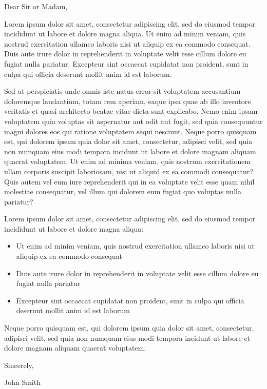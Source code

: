 \documentclass{../classes/coverletter}
\begin{document}
    \begin{body}
        Dear Sir or Madam,
        \newline

        Lorem ipsum dolor sit amet, consectetur adipiscing elit, sed do eiusmod tempor incididunt ut labore et dolore magna aliqua. Ut enim ad minim veniam, quis nostrud exercitation ullamco laboris nisi ut aliquip ex ea commodo consequat. Duis aute irure dolor in reprehenderit in voluptate velit esse cillum dolore eu fugiat nulla pariatur. Excepteur sint occaecat cupidatat non proident, sunt in culpa qui officia deserunt mollit anim id est laborum.
        \newline

        Sed ut perspiciatis unde omnis iste natus error sit voluptatem accusantium doloremque laudantium, totam rem aperiam, eaque ipsa quae ab illo inventore veritatis et quasi architecto beatae vitae dicta sunt explicabo. Nemo enim ipsam voluptatem quia voluptas sit aspernatur aut odit aut fugit, sed quia consequuntur magni dolores eos qui ratione voluptatem sequi nesciunt. Neque porro quisquam est, qui dolorem ipsum quia dolor sit amet, consectetur, adipisci velit, sed quia non numquam eius modi tempora incidunt ut labore et dolore magnam aliquam quaerat voluptatem. Ut enim ad minima veniam, quis nostrum exercitationem ullam corporis suscipit laboriosam, nisi ut aliquid ex ea commodi consequatur? Quis autem vel eum iure reprehenderit qui in ea voluptate velit esse quam nihil molestiae consequatur, vel illum qui dolorem eum fugiat quo voluptas nulla pariatur?
        \newline

        Lorem ipsum dolor sit amet, consectetur adipiscing elit, sed do eiusmod tempor incididunt ut labore et dolore magna aliqua:
        \begin{itemize}
            \item Ut enim ad minim veniam, quis nostrud exercitation ullamco laboris nisi ut aliquip ex ea commodo consequat
            \item Duis aute irure dolor in reprehenderit in voluptate velit esse cillum dolore eu fugiat nulla pariatur
            \item Excepteur sint occaecat cupidatat non proident, sunt in culpa qui officia deserunt mollit anim id est laborum
            \newline
        \end{itemize}

        Neque porro quisquam est, qui dolorem ipsum quia dolor sit amet, consectetur, adipisci velit, sed quia non numquam eius modi tempora incidunt ut labore et dolore magnam aliquam quaerat voluptatem.
        \newline

        Sincerely,
        \newline

        \signature{images/signature.png}

        John Smith
    
    \end{body}
\end{document}

